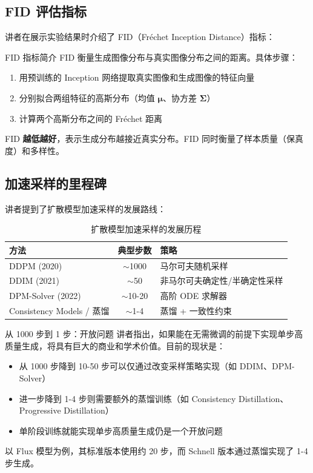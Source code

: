 \documentclass[a4paper]{article}
\begin{document}
\subsection{FID 评估指标}

讲者在展示实验结果时介绍了 FID（Fr\'{e}chet Inception Distance）指标：

\begin{knowledgebox}{FID 指标简介}
FID 衡量生成图像分布与真实图像分布之间的距离。具体步骤：
\begin{enumerate}
    \item 用预训练的 Inception 网络提取真实图像和生成图像的特征向量
    \item 分别拟合两组特征的高斯分布（均值 $\boldsymbol{\mu}$、协方差 $\boldsymbol{\Sigma}$）
    \item 计算两个高斯分布之间的 Fr\'{e}chet 距离
\end{enumerate}
FID \textbf{越低越好}，表示生成分布越接近真实分布。FID 同时衡量了样本质量（保真度）和多样性。
\end{knowledgebox}

\subsection{加速采样的里程碑}

讲者提到了扩散模型加速采样的发展路线：

\begin{table}[H]
\centering
\caption{扩散模型加速采样的发展历程}
\begin{tabular}{lcl}
\toprule
\textbf{方法} & \textbf{典型步数} & \textbf{策略} \\
\midrule
DDPM (2020) & $\sim$1000 & 马尔可夫随机采样 \\
DDIM (2021) & $\sim$50 & 非马尔可夫确定性/半确定性采样 \\
DPM-Solver (2022) & $\sim$10-20 & 高阶 ODE 求解器 \\
Consistency Models / 蒸馏 & $\sim$1-4 & 蒸馏 + 一致性约束 \\
\bottomrule
\end{tabular}
\end{table}

\begin{knowledgebox}{从 1000 步到 1 步：开放问题}
讲者指出，如果能在无需微调的前提下实现单步高质量生成，将具有巨大的商业和学术价值。目前的现状是：
\begin{itemize}
    \item 从 1000 步降到 10-50 步可以仅通过改变采样策略实现（如 DDIM、DPM-Solver）
    \item 进一步降到 1-4 步则需要额外的蒸馏训练（如 Consistency Distillation、Progressive Distillation）
    \item 单阶段训练就能实现单步高质量生成仍是一个开放问题
\end{itemize}
以 Flux 模型为例，其标准版本使用约 20 步，而 Schnell 版本通过蒸馏实现了 1-4 步生成。
\end{knowledgebox}
\end{document}
